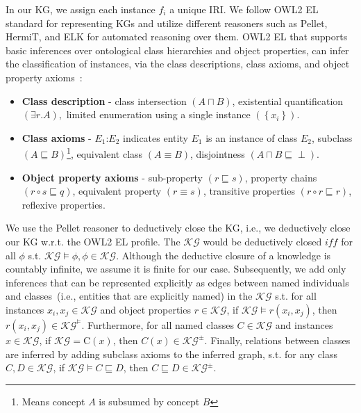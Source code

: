 \hspace*{3.5mm} In our KG, we assign each instance $f_i$ a unique IRI. We follow OWL2 EL standard for representing KGs and utilize different reasoners such as Pellet, HermiT, and ELK for automated reasoning over them. OWL2 EL that supports basic inferences over ontological class hierarchies and object properties, can infer the classification of instances, via  the class descriptions, class axioms, and object property axioms~\cite{alshahrani2017neuro}: 

\begin{itemize}[noitemsep]
\vspace{-4mm}
    \item \textbf{Class description} - class intersection $(A \sqcap B)$, existential quantification $(\exists r . A),$ limited enumeration using a single instance $\left(\left\{x_{i}\right\}\right)$. 
    \item \textbf{Class axioms} - $E_{1}$:$E_{2}$ indicates entity $E_{1}$ is an instance of class $E_{2}$, subclass $(A \sqsubseteq B)$\footnote{Means concept $A$ is subsumed by concept $B$}, equivalent class $(A \equiv B)$, disjointness $(A \sqcap B \sqsubseteq \perp)$. 
    \item \textbf{Object property axioms} - sub-property $(r \sqsubseteq s)$, property chains $(r \circ s \sqsubseteq q)$, equivalent property $(r \equiv s)$, transitive properties $(r \circ r \sqsubseteq r)$, reflexive properties. 
    \vspace{-4mm}
\end{itemize}

\hspace*{3.5mm} We use the Pellet reasoner to deductively close the KG, i.e., we deductively close our KG w.r.t. the OWL2 EL profile. The $\mathcal{KG}$ would be deductively closed $iff$ for all $\phi$ s.t. $\mathcal{KG} \models \phi, \phi \in \mathcal{KG}$. Although the deductive closure of a knowledge is countably infinite, we assume it is finite for our case. Subsequently, we add only inferences that can be represented explicitly as edges between named individuals and classes~(i.e., entities that are explicitly named) in the $\mathcal{KG}$ s.t. for all instances $x_{i}, x_{j} \in \mathcal{KG}$ and object properties $r \in \mathcal{KG}$, if $\mathcal{KG} \models r\left(x_{i}, x_{j}\right)$, then $r\left(x_{i}, x_{j}\right) \in \mathcal{KG} ^{\models}$. Furthermore, for all named classes $C \in \mathcal{KG}$ and instances $x \in \mathcal{KG}$, if $\mathcal{KG}=\mathrm{C}(x)$, then $C(x) \in \mathcal{KG} ^{\pm}$. Finally, relations between classes are inferred by adding subclass axioms to the inferred graph, s.t. for any class $C, D \in \mathcal{KG}$, if $\mathcal{KG} \models C \sqsubseteq D$, then $C \sqsubseteq D \in \mathcal{KG}^{\pm}$. 

